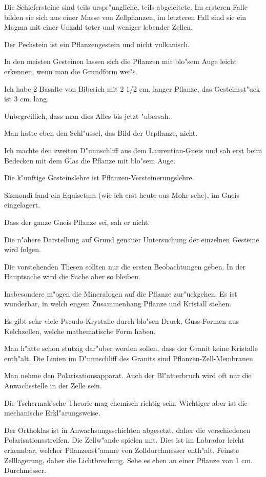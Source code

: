 \documentclass[a4paper, 11pt, oneside, german]{article}
\begin{document}
Die Schiefersteine sind teils urspr"ungliche, teils abgeleitete. Im ersteren Falle bilden sie sich aus einer Masse von Zellpflanzen, im letzteren Fall sind sie ein Magma mit einer Unzahl toter und weniger lebender Zellen.

Der Pechstein ist ein Pflanzengestein und nicht vulkanisch.

In den meisten Gesteinen lassen sich die Pflanzen mit blo"sem Auge leicht erkennen, wenn man die Grundform wei"s.

Ich habe 2 Basalte von Biberich mit 2 1/2 cm. langer Pflanze, das Gesteinsst"uck ist 3 cm. lang.

Unbegreiflich, dass man dies Alles bis jetzt "ubersah.

Man hatte eben den Schl"ussel, das Bild der Urpflanze, nicht.

Ich machte den zweiten D"unnschliff aus dem Laurentian-Gneis und sah erst beim Bedecken mit dem Glas die Pflanze mit blo"sem Auge.

Die k"unftige Gesteinslehre ist Pflanzen-Versteinerungslehre.

Sismondi fand ein Equisetum (wie ich erst heute aus Mohr sehe), im Gneis eingelagert.

Dass der ganze Gneis Pflanze sei, sah er nicht.

Die n"ahere Darstellung auf Grund genauer Untersuchung der einzelnen Gesteine wird folgen.

Die vorstehenden Thesen sollten nur die ersten Beobachtungen geben. In der Hauptsache wird die Sache aber so bleiben.

Insbesondere m"ogen die Mineralogen auf die Pflanze zur"uckgehen. Es ist wunderbar, in welch engem Zusammenhang Pflanze und Kristall stehen.

Es gibt sehr viele Pseudo-Krystalle durch blo"sen Druck, Guss-Formen aus Kelchzellen, welche mathematische Form haben.

Man h"atte schon stutzig dar"uber werden sollen, dass der Granit keine Kristalle enth"alt. Die Linien im D"unnschliff des Granits sind Pflanzen-Zell-Membranen.

Man nehme den Polarisationsapparat. Auch der Bl"atterbruch wird oft nur die Anwachsstelle in der Zelle sein.

Die Tschermak'sche Theorie mag chemisch richtig sein. Wichtiger aber ist die mechanische Erkl"arungsweise.

Der Orthoklas ist in Anwachsungsschichten abgesetzt, daher die verschiedenen Polarisationsstreifen. Die Zellw"ande spielen mit. Dies ist im Labrador leicht erkennbar, welcher Pflanzenst"amme von Zolldurchmesser enth"alt. Feinste Zelllagerung, daher die Lichtbrechung. Sehe es eben an einer Pflanze von 1 cm. Durchmesser.
\end{document}
